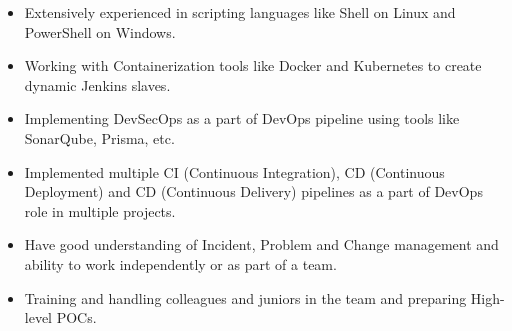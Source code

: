 \documentclass[11pt, a4paper]{article}
\begin{document}
\begin{itemize}[noitemsep, nolistsep]
\item Extensively experienced in scripting languages like Shell on Linux and PowerShell on Windows.
\item Working with Containerization tools like Docker and Kubernetes to create dynamic Jenkins slaves.
\item Implementing DevSecOps as a part of DevOps pipeline using tools like SonarQube, Prisma, etc.
\item Implemented multiple CI (Continuous Integration), CD (Continuous Deployment) and CD (Continuous Delivery) pipelines as a part of DevOps role in multiple projects.
\item Have good understanding of Incident, Problem and Change management and ability to work independently or as part of a team.
\item Training and handling colleagues and juniors in the team and preparing High-level POCs.
\end{itemize}
\pagebreak
\end{document}
